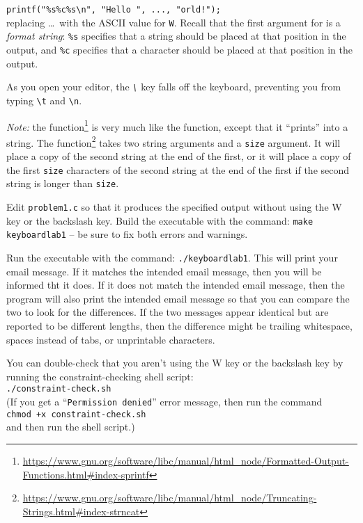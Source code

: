 \lstinline{printf("%s%c%s\n", "Hello ", ..., "orld!");} \\
replacing \dots\ with the ASCII value for \texttt{W}.
Recall that the first argument for  is a \textit{format string}: \texttt{\%s} specifies that a string should be placed at that position in the output, and \texttt{\%c} specifies that a character should be placed at that position in the output.

As you open your editor, the \textit{\texttt{\textbackslash}} key falls off the keyboard, preventing you from typing \texttt{\textbackslash t} and \texttt{\textbackslash n}.

\textit{Note: } the  function\footnote{\url{https://www.gnu.org/software/libc/manual/html_node/Formatted-Output-Functions.html\#index-sprintf}} is very much like the  function, except that it ``prints'' into a string.
The  function\footnote{\url{https://www.gnu.org/software/libc/manual/html_node/Truncating-Strings.html\#index-strncat}} takes two string arguments and a \lstinline{size} argument.
It will place a copy of the second string at the end of the first, or it will place a copy of the first \lstinline{size} characters of the second string at the end of the first if the second string is longer than \lstinline{size}.

Edit \texttt{problem1.c} so that it produces the specified output without using the W key or the backslash key.
Build the executable with the command: \texttt{make keyboardlab1} -- be sure to fix both errors and warnings.

Run the executable with the command: \texttt{./keyboardlab1}.
This will print your email message.
If it matches the intended email message, then you will be informed tht it does.
If it does not match the intended email message, then the program will also print the intended email message so that you can compare the two to look for the differences.
If the two messages appear identical but are reported to be different lengths, then the difference might be trailing whitespace, spaces instead of tabs, or unprintable characters.

You can double-check that you aren't using the W key or the backslash key by running the constraint-checking shell script: \\
\texttt{./constraint-check.sh} \\
(If you get a ``\texttt{Permission denied}'' error message, then run the command \\
\texttt{chmod +x constraint-check.sh} \\
and then run the shell script.)

